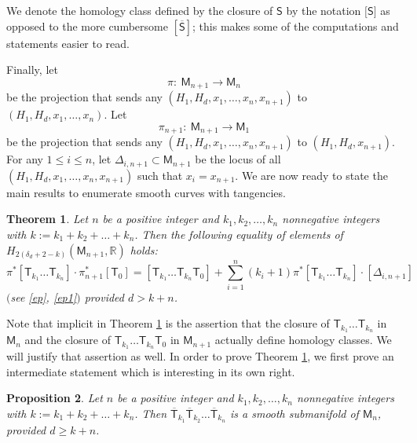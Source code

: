 \documentclass[11pt]{article}
\numberwithin{equation}{section}
\newtheorem{thm}{Theorem}[section]
\newtheorem{prp}[thm]{Proposition}
\begin{document}
We denote the homology class defined by the closure of $\mathsf{S}$
by the notation $\big[\mathsf{S}\big]$ as opposed to the more cumbersome $[\overline{\mathsf{S}}]$; this makes
some of the computations and statements easier to read.

Finally, let
\begin{equation}\label{ep}
\pi \colon\ \mathsf{M}_{n+1} \longrightarrow \mathsf{M}_n
\end{equation}
be the projection that sends
any $(H_1, H_d, x_1, \dots, x_{n}, x_{n+1})$ to $(H_1, H_d, x_1, \dots, x_{n})$. Let
\begin{equation}\label{ep1}
\pi_{n+1} \colon\  \mathsf{M}_{n+1} \longrightarrow \mathsf{M}_1
\end{equation}
be the projection that sends any $(H_1, H_d, x_1, \dots, x_{n}, x_{n+1})$ to
$(H_1, H_d, x_{n+1})$. For any $1 \leq i \leq n$, let
$
\Delta_{i, {n+1}}  \subset  \mathsf{M}_{n+1}
$
be the locus of all $(H_1, H_d, x_1, \dots, x_{n}, x_{n+1})$ such that $x_i = x_{n+1}$.
We are now ready to state the main results to enumerate smooth curves with tangencies.

\begin{thm}\label{theorem_for_many_Tks}
Let $n$ be a positive integer and $k_1, k_2,\dots, k_{n}$ nonnegative integers
with
$
k :=  k_1+k_2+\dots +k_n$.
Then the following equality of elements of $H_{2(\delta_d+2- k)}(\mathsf{M}_{n+1}, {\mathbb R})$ holds:
\begin{equation}\label{many_Tks}
\pi^{\ast}[\mathsf{T}_{k_1}\dots \mathsf{T}_{k_n}]\cdot
\pi_{n+1}^{\ast}[\mathsf{T}_0] =
[\mathsf{T}_{k_1}\dots \mathsf{T}_{k_n} \mathsf{T}_{0}]
 + \sum_{i=1}^{n}(k_i+1) \pi^{\ast}[\mathsf{T}_{k_1}\dots \mathsf{T}_{k_n}] \cdot [\Delta_{i, {n+1}}]
\end{equation}
$($see \eqref{ep}, \eqref{ep1}$)$ provided $d > k+n$.
\end{thm}

Note that implicit in Theorem \ref{theorem_for_many_Tks} is the assertion that
the closure of $\mathsf{T}_{k_1}\dots \mathsf{T}_{k_n}$ in
$\mathsf{M}_n$ and the closure of
$\mathsf{T}_{k_1}\dots \mathsf{T}_{k_n} \mathsf{T}_{0}$ in $\mathsf{M}_{n+1}$
actually define homology classes. We will justify that assertion as well.
In order to prove Theorem \ref{theorem_for_many_Tks}, we first prove an intermediate statement
which is interesting in its own right.
\begin{prp}
\label{prp_smth_mfld}
Let $n$ be a positive integer and $k_1, k_2,\dots, k_{n}$ nonnegative integers
with
$ k :=  k_1+k_2+\dots +k_n$.
Then $\overline{\mathsf{T}}_{k_1} \overline{\mathsf{T}}_{k_2}\dots \overline{\mathsf{T}}_{k_n}$
is a smooth submanifold of $\mathsf{M}_{n}$, provided
$d \geq k+n$.
\end{prp}
\end{document}
